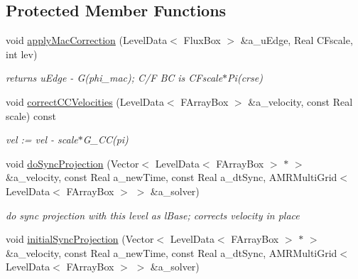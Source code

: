 \subsection*{Protected Member Functions}
\begin{DoxyCompactItemize}
\item 
\hypertarget{class_c_c_projector_comp_ad3b3cb46ebc98dfee8e9ff2a08eb175b}{void \hyperlink{class_c_c_projector_comp_ad3b3cb46ebc98dfee8e9ff2a08eb175b}{apply\-Mac\-Correction} (Level\-Data$<$ Flux\-Box $>$ \&a\-\_\-u\-Edge, Real C\-Fscale, int lev)}\label{class_c_c_projector_comp_ad3b3cb46ebc98dfee8e9ff2a08eb175b}

\begin{DoxyCompactList}\small\item\em returns u\-Edge -\/ G(phi\-\_\-mac); C/\-F B\-C is C\-Fscale$\ast$\-Pi(crse) \end{DoxyCompactList}\item 
\hypertarget{class_c_c_projector_comp_ab62641c0490ad7123a2153d64a3db559}{void \hyperlink{class_c_c_projector_comp_ab62641c0490ad7123a2153d64a3db559}{correct\-C\-C\-Velocities} (Level\-Data$<$ F\-Array\-Box $>$ \&a\-\_\-velocity, const Real scale) const }\label{class_c_c_projector_comp_ab62641c0490ad7123a2153d64a3db559}

\begin{DoxyCompactList}\small\item\em vel \-:= vel -\/ scale$\ast$\-G\-\_\-\-C\-C(pi) \end{DoxyCompactList}\item 
\hypertarget{class_c_c_projector_comp_a50c2d2c9857ed2410cfe256af3c3e080}{void \hyperlink{class_c_c_projector_comp_a50c2d2c9857ed2410cfe256af3c3e080}{do\-Sync\-Projection} (Vector$<$ Level\-Data$<$ F\-Array\-Box $>$ $\ast$ $>$ \&a\-\_\-velocity, const Real a\-\_\-new\-Time, const Real a\-\_\-dt\-Sync, A\-M\-R\-Multi\-Grid$<$ Level\-Data$<$ F\-Array\-Box $>$ $>$ \&a\-\_\-solver)}\label{class_c_c_projector_comp_a50c2d2c9857ed2410cfe256af3c3e080}

\begin{DoxyCompactList}\small\item\em do sync projection with this level as l\-Base; corrects velocity in place \end{DoxyCompactList}\item 
\hypertarget{class_c_c_projector_comp_ac025c336f68f2c456630634359ab767c}{void \hyperlink{class_c_c_projector_comp_ac025c336f68f2c456630634359ab767c}{initial\-Sync\-Projection} (Vector$<$ Level\-Data$<$ F\-Array\-Box $>$ $\ast$ $>$ \&a\-\_\-velocity, const Real a\-\_\-new\-Time, const Real a\-\_\-dt\-Sync, A\-M\-R\-Multi\-Grid$<$ Level\-Data$<$ F\-Array\-Box $>$ $>$ \&a\-\_\-solver)}\label{class_c_c_projector_comp_ac025c336f68f2c456630634359ab767c}


\end{DoxyCompactItemize}
